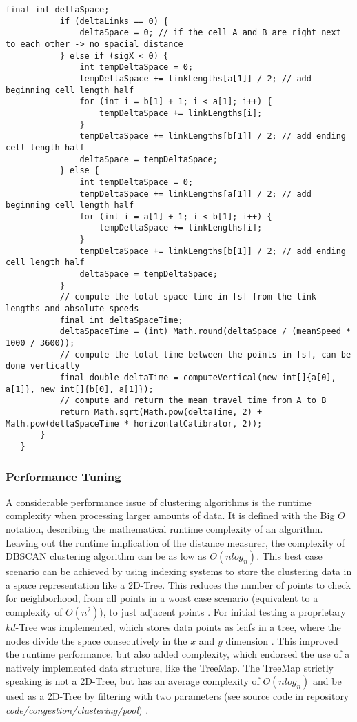 \begin{lstlisting}[basicstyle=\tiny, style=java, caption={Implementation of \textit{diagonal distance calculation}}, label=lst:distance_calc_diagonal]
		   final int deltaSpace;
		   if (deltaLinks == 0) {
			   deltaSpace = 0; // if the cell A and B are right next to each other -> no spacial distance
		   } else if (sigX < 0) {
			   int tempDeltaSpace = 0;
			   tempDeltaSpace += linkLengths[a[1]] / 2; // add beginning cell length half
			   for (int i = b[1] + 1; i < a[1]; i++) {
				   tempDeltaSpace += linkLengths[i];
			   }
			   tempDeltaSpace += linkLengths[b[1]] / 2; // add ending cell length half
			   deltaSpace = tempDeltaSpace;
		   } else {
			   int tempDeltaSpace = 0;
			   tempDeltaSpace += linkLengths[a[1]] / 2; // add beginning cell length half
			   for (int i = a[1] + 1; i < b[1]; i++) {
				   tempDeltaSpace += linkLengths[i];
			   }
			   tempDeltaSpace += linkLengths[b[1]] / 2; // add ending cell length half
			   deltaSpace = tempDeltaSpace;
		   }
		   // compute the total space time in [s] from the link lengths and absolute speeds
		   final int deltaSpaceTime;
		   deltaSpaceTime = (int) Math.round(deltaSpace / (meanSpeed * 1000 / 3600));
		   // compute the total time between the points in [s], can be done vertically
		   final double deltaTime = computeVertical(new int[]{a[0], a[1]}, new int[]{b[0], a[1]});
		   // compute and return the mean travel time from A to B
		   return Math.sqrt(Math.pow(deltaTime, 2) + Math.pow(deltaSpaceTime * horizontalCalibrator, 2));
	   }
   }
\end{lstlisting}

\subsubsection{Performance Tuning}
A considerable performance issue of clustering algorithms is the runtime complexity when processing larger amounts of data. It is defined with the Big $O$ notation, describing the mathematical runtime complexity of an algorithm. Leaving out the runtime implication of the distance measurer, the complexity of DBSCAN clustering algorithm can be as low as $O(nlog_n)$. This best case scenario can be achieved by using indexing systems to store the clustering data in a space representation like a 2D-Tree. This reduces the number of points to check for neighborhood, from all points in a worst case scenario (equivalent to a complexity of $O(n^2)$), to just adjacent points \parencite{Chauhan2020}. For initial testing a proprietary $kd$-Tree was implemented, which stores data points as leafs in a tree, where the nodes divide the space consecutively in the $x$ and $y$ dimension \parencite{Hucker2020,Dalitz2009}. This improved the runtime performance, but also added complexity, which endorsed the use of a natively implemented data structure, like the TreeMap. The TreeMap strictly speaking is not a 2D-Tree, but has an average complexity of $O(nlog_n)$ and be used as a 2D-Tree by filtering with two parameters (see source code in repository \textit{code/congestion/clustering/pool}) \parencite{Baeldung2020_1,Baeldung2020_2}.


